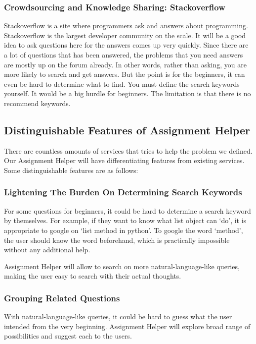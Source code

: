 \documentclass[conference]{IEEEtran}
\begin{document}
\subsubsection{Crowdsourcing and Knowledge Sharing: Stackoverflow}
Stackoverflow is a site where programmers ask and answers about programming. Stackoverflow is the largest developer community on the scale. It will be a good idea to ask questions here for the answers comes up very quickly.
Since there are a lot of questions that has been answered, the problems that you need answers are mostly up on the forum already. In other words, rather than asking, you are more likely to search and get answers. But the point is for the beginners, it can even be hard to determine what to find. You must define the search keywords yourself. It would be a big hurdle for beginners. The limitation is that there is no recommend keywords.

\subsection{Distinguishable Features of Assignment Helper} %
\label{sub:distinguishable_features_of_assignment_helper}
There are countless amounts of services that tries to help the problem we defined. Our Assignment Helper will have differentiating features from existing services. Some distinguishable features are as follows:

\subsubsection{Lightening The Burden On Determining Search Keywords}
For some questions for beginners, it could be hard to determine a search keyword by themselves. For example, if they want to know what list object can ‘do’, it is appropriate to google on ‘list method in python’. To google the word ‘method’, the user should know the word beforehand, which is practically impossible without any additional help.


Assignment Helper will allow to search on more natural-language-like queries, making the user easy to search with their actual thoughts.

\subsubsection{Grouping Related Questions}
With natural-language-like queries, it could be hard to guess what the user intended from the very beginning. Assignment Helper will explore broad range of possibilities and suggest each to the users.
\end{document}
